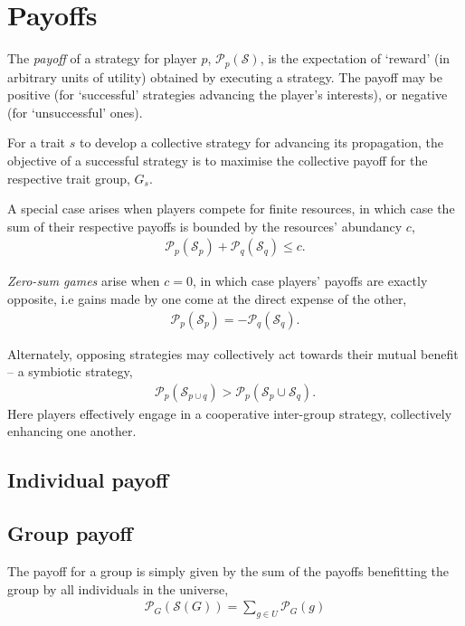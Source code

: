 \documentclass[twocolumn, aps, rmp, amsmath, amssymb, nofootinbib, superscriptaddress, longbibliography, floatfix, table-of-contents, eqsecnum]{revtex4-1}
\begin{document}

\section{Payoffs}

The \textit{payoff} of a strategy for player $p$, $\mathcal{P}_p(\mathcal{S})$, is the expectation of `reward' (in arbitrary units of utility) obtained by executing a strategy. The payoff may be positive (for `successful' strategies advancing the player's interests), or negative (for `unsuccessful' ones).

For a trait $s$ to develop a collective strategy for advancing its propagation, the objective of a successful strategy is to maximise the collective payoff for the respective trait group, $G_s$.

A special case arises when players compete for finite resources, in which case the sum of their respective payoffs is bounded by the resources' abundancy $c$,
\begin{align}
	\mathcal{P}_p(\mathcal{S}_p) + \mathcal{P}_q(\mathcal{S}_q) \leq c.
\end{align}

\textit{Zero-sum games} arise when $c=0$, in which case players' payoffs are exactly opposite, i.e gains made by one come at the direct expense of the other,
\begin{align}
\mathcal{P}_p(\mathcal{S}_p) = -\mathcal{P}_q(\mathcal{S}_q).
\end{align}

Alternately, opposing strategies may collectively act towards their mutual benefit -- a symbiotic strategy,
\begin{align}
\mathcal{P}_p(\mathcal{S}_{p\cup q}) > \mathcal{P}_p(\mathcal{S}_p\cup \mathcal{S}_q).
\end{align}
Here players effectively engage in a cooperative inter-group strategy, collectively enhancing one another.

\subsection{Individual payoff}

\subsection{Group payoff}

The payoff for a group is simply given by the sum of the payoffs benefitting the group by all individuals in the universe,
\begin{align}
	\mathcal{P}_{G}(\mathcal{S}(G)) = \sum_{g\in U} \mathcal{P}_G(g)
\end{align}
\end{document}
